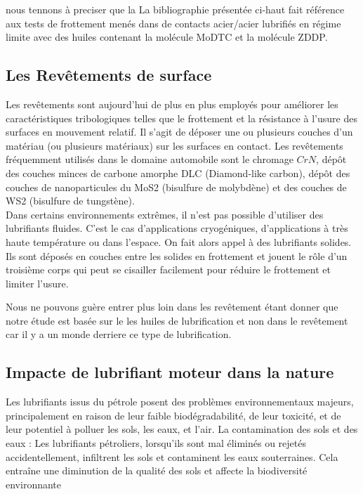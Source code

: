 nous tennons à preciser que la La bibliographie présentée ci-haut fait référence aux tests de frottement menés dans de contacts acier/acier lubrifiés en régime limite avec des huiles contenant la molécule MoDTC et la molécule ZDDP.

\subsection{Les Revêtements de surface}
Les revêtements sont aujourd'hui de plus en plus employés pour améliorer les caractéristiques tribologiques telles que le frottement et la résistance à l'usure des surfaces en mouvement relatif. Il s'agit de déposer une ou plusieurs couches d'un matériau (ou plusieurs matériaux) sur les surfaces en contact. Les revêtements fréquemment utilisés dans le domaine automobile sont le chromage $CrN$, dépôt des couches minces de carbone amorphe DLC (Diamond-like carbon), dépôt des couches de nanoparticules du MoS2 (bisulfure de molybdène) et des couches de WS2 (bisulfure de tungstène).\cite{Amal}\\

Dans certains environnements extrêmes, il n’est pas possible d’utiliser des lubrifiants fluides. C’est le cas d’applications cryogéniques, d’applications à très haute température ou dans l’espace. On fait alors appel à des lubrifiants solides. Ils sont déposés en couches entre les solides en frottement et jouent le rôle d’un troisième corps qui peut se cisailler facilement pour réduire le frottement et limiter l’usure.

Nous ne pouvons guère entrer plus loin dans les revêtement étant donner que notre étude est basée sur le les huiles de lubrification et non dans le revêtement car il y a un monde derriere ce type de lubrification.
\subsection{Impacte de lubrifiant moteur dans la nature}
Les lubrifiants issus du pétrole posent des problèmes environnementaux majeurs, principalement en raison de leur faible biodégradabilité, de leur toxicité, et de leur potentiel à polluer les sols, les eaux, et l’air. La contamination des sols et des eaux : Les lubrifiants pétroliers, lorsqu'ils sont mal éliminés ou rejetés accidentellement, infiltrent les sols et contaminent les eaux souterraines. Cela entraîne une diminution de la qualité des sols et affecte la biodiversité environnante\cite{enveroile}\\

